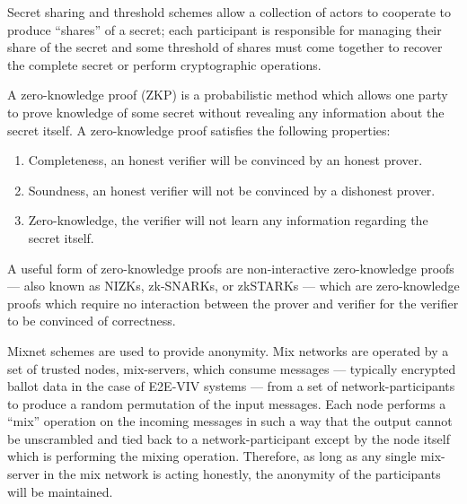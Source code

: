 Secret sharing and threshold schemes allow a collection of actors to cooperate
to produce ``shares'' of a secret; each participant is responsible for
managing their share of the secret and some threshold of shares must come
together to recover the complete secret or perform cryptographic
operations.\cite{distributed-key-generation,large-scale-distributed-key-generation}

A zero-knowledge proof (ZKP) is a probabilistic method which allows one party
to prove knowledge of some secret without revealing any information about the
secret itself. A zero-knowledge proof satisfies the following properties:\cite{e2e-viv,zkproof}
%
\begin{enumerate}
  \item Completeness, an honest verifier will be convinced by an honest prover.
  \item Soundness, an honest verifier will not be convinced by a dishonest
    prover.
  \item Zero-knowledge, the verifier will not learn any information regarding
    the secret itself.
\end{enumerate}
%
A useful form of zero-knowledge proofs are non-interactive zero-knowledge
proofs --- also known as NIZKs, zk-SNARKs, or zkSTARKs --- which are
zero-knowledge proofs which require no interaction between the prover and
verifier for the verifier to be convinced of
correctness.\cite{helios,almost-correct-mixing,vector-ballot-voting,mix-networks}

Mixnet schemes are used to provide anonymity. Mix networks are operated by a
set of trusted nodes, mix-servers, which consume messages --- typically
encrypted ballot data in the case of E2E-VIV systems --- from a set of
network-participants to produce a random permutation of the input messages.
Each node performs a ``mix'' operation on the incoming messages in such a way
that the output cannot be unscrambled and tied back to a network-participant
except by the node itself which is performing the mixing operation. Therefore,
as long as any single mix-server in the mix network is acting honestly, the
anonymity of the participants will be
maintained.\cite{mix-networks,vector-ballot-voting}

